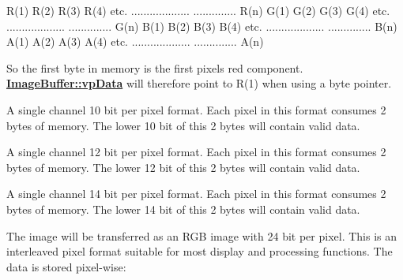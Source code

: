 \begin{Desc}
\begin{description}
\begin{DoxyCode}
R(1) R(2) R(3) R(4) etc.
...................
.............. R(n)
G(1) G(2) G(3) G(4) etc.
...................
.............. G(n)
B(1) B(2) B(3) B(4) etc.
...................
.............. B(n)
A(1) A(2) A(3) A(4) etc.
...................
.............. A(n)
\end{DoxyCode}


So the first byte in memory is the first pixels red component. {\bfseries \hyperlink{struct_image_buffer_ab67c9c21d749e786302c848b508e0673}{Image\+Buffer\+::vp\+Data}} will therefore point to R(1) when using a byte pointer. \item[{\em 
\hypertarget{group___common_interface_gga456e8aa76e06bb761f27c52141475985a4dd56a36e2c58005972bb1fcdaaeea28}{ibpf\+Mono10}\label{group___common_interface_gga456e8aa76e06bb761f27c52141475985a4dd56a36e2c58005972bb1fcdaaeea28}
}]A single channel 10 bit per pixel format. Each pixel in this format consumes 2 bytes of memory. The lower 10 bit of this 2 bytes will contain valid data. \item[{\em 
\hypertarget{group___common_interface_gga456e8aa76e06bb761f27c52141475985a8d087d79bca584a5f39377c4b91cc2db}{ibpf\+Mono12}\label{group___common_interface_gga456e8aa76e06bb761f27c52141475985a8d087d79bca584a5f39377c4b91cc2db}
}]A single channel 12 bit per pixel format. Each pixel in this format consumes 2 bytes of memory. The lower 12 bit of this 2 bytes will contain valid data. \item[{\em 
\hypertarget{group___common_interface_gga456e8aa76e06bb761f27c52141475985ad0186270833b635591f3f39552f18942}{ibpf\+Mono14}\label{group___common_interface_gga456e8aa76e06bb761f27c52141475985ad0186270833b635591f3f39552f18942}
}]A single channel 14 bit per pixel format. Each pixel in this format consumes 2 bytes of memory. The lower 14 bit of this 2 bytes will contain valid data. \item[{\em 
\hypertarget{group___common_interface_gga456e8aa76e06bb761f27c52141475985a3f1a4a1c5c07e28ce6d7e21546846a59}{ibpf\+R\+G\+B888\+Packed}\label{group___common_interface_gga456e8aa76e06bb761f27c52141475985a3f1a4a1c5c07e28ce6d7e21546846a59}
}]The image will be transferred as an R\+G\+B image with 24 bit per pixel. This is an interleaved pixel format suitable for most display and processing functions. The data is stored pixel-\/wise\+:



\end{description}
\end{Desc}
